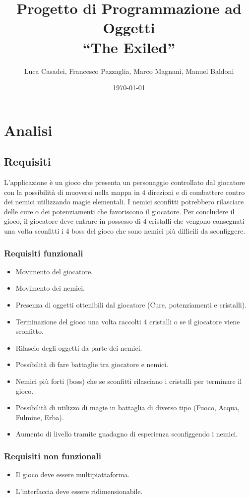 \documentclass[a4paper,12pt]{report}
\title{Progetto di Programmazione ad Oggetti\\``The Exiled''}
\author{Luca Casadei, Francesco Pazzaglia, Marco Magnani, Manuel Baldoni}
\date{\today}
\begin{document}
\maketitle

\tableofcontents

\chapter{Analisi}

\section{Requisiti}
L'applicazione è un gioco che presenta un personaggio controllato dal giocatore con la possibilità di muoversi nella mappa in 4 direzioni e di combattere contro dei nemici utilizzando magie elementali. I nemici sconfitti potrebbero rilasciare delle cure o dei potenziamenti che favoriscono il giocatore. Per concludere il gioco, il giocatore deve entrare in possesso di 4 cristalli che vengono consegnati una volta sconfitti i 4 boss del gioco che sono nemici più difficili da sconfiggere.
\subsection*{Requisiti funzionali}
\begin{itemize}
    \item Movimento del giocatore.
    \item Movimento dei nemici.
    \item Presenza di oggetti ottenibili dal giocatore (Cure, potenziamenti e cristalli).
    \item Terminazione del gioco una volta raccolti 4 cristalli o se il giocatore viene sconfitto.
    \item Rilascio degli oggetti da parte dei nemici.
    \item Possibilità di fare battaglie tra giocatore e nemici.
    \item Nemici più forti (boss) che se sconfitti rilasciano i cristalli per terminare il gioco.
    \item Possibilità di utilizzo di magie in battaglia di diverso tipo (Fuoco, Acqua, Fulmine, Erba).
    \item Aumento di livello tramite guadagno di esperienza sconfiggendo i nemici.
\end{itemize}

\subsection*{Requisiti non funzionali}
\begin{itemize}
    \item Il gioco deve essere multipiattaforma.
    \item L'interfaccia deve essere ridimensionabile.
\end{itemize}
\end{document}
